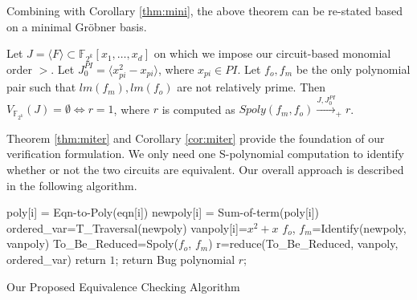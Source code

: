 Combining with Corollary \ref{thm:mini}, the above theorem can be
re-stated based on a minimal Gr\"obner basis. 
\begin{Corollary}\label{cor:miter}
Let $J=\langle F \rangle \subset \mathbb{F}_{2^k}[x_{1},\dots,x_{d}]$ 
on which we impose our circuit-based monomial order $>$.
Let $J_0^{PI}=\langle x_{pi}^{2}-x_{pi}\rangle$, where $x_{pi}\in PI$.
Let $f_o, f_m$ be the only polynomial pair such that $lm(f_m),
lm(f_o)$ are not relatively prime. Then
$V_{\mathbb{F}_{2^k}}(J)=\emptyset \iff r=1$, where $r$ is computed as
$Spoly(f_m,f_o) \stackrel{J,J_0^{PI}}{\longrightarrow}_+ r$.

\end{Corollary}

Theorem \ref{thm:miter} and Corollary \ref{cor:miter} provide the
foundation of our verification formulation. We only need one
S-polynomial computation to identify whether or not the two circuits
are equivalent. Our overall approach is described in the following
algorithm. 


\begin{algorithm}[hbt]
\SetAlgoNoLine


  	{
  		poly[i] = Eqn-to-Poly(eqn[i])\;
  		newpoly[i] = Sum-of-term(poly[i])\;
	}
ordered\_var=T\_Traversal(newpoly)\;
	{
    	vanpoly[i]=$x^2+x$\;
	}    
{$f_{o}$, $f_{m}$}=Identify(newpoly, vanpoly)\;
To\_Be\_Reduced=Spoly($f_{o}$, $f_{m}$)\;
r=reduce(To\_Be\_Reduced, vanpoly, ordered\_var)\;
   {
   	 return $1$;
   }
   {
   	 return Bug polynomial $r$; %
   }	 

\caption{Our Proposed Equivalence Checking Algorithm}\label{alg:ecall}
\end{algorithm}


